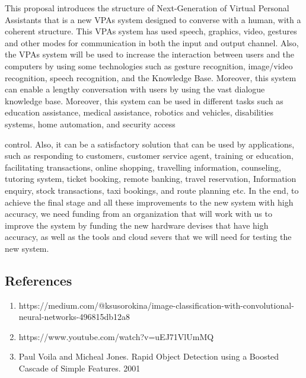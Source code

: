 \documentclass[12pt,a4paper]{article}
\begin{document}
This proposal introduces the structure of Next-Generation
of Virtual Personal Assistants that is a new VPAs system
designed to converse with a human, with a coherent structure.
This VPAs system has used speech, graphics, video, gestures
and other modes for communication in both the input and
output channel. Also, the VPAs system will be used to increase
the interaction between users and the computers by using some
technologies such as gesture recognition, image/video
recognition, speech recognition, and the Knowledge Base.
Moreover, this system can enable a lengthy conversation with
users by using the vast dialogue knowledge base. Moreover,
this system can be used in different tasks such as education
assistance, medical assistance, robotics and vehicles,
disabilities systems, home automation, and security access
\par
control. Also, it can be a satisfactory solution that can be used
by applications, such as responding to customers, customer
service agent, training or education, facilitating transactions,
online shopping, travelling information, counseling, tutoring
system, ticket booking, remote banking, travel reservation,
Information enquiry, stock transactions, taxi bookings, and
route planning etc. In the end, to achieve the final stage and all
these improvements to the new system with high accuracy, we
need funding from an organization that will work with us to
improve the system by funding the new hardware devises that
have high accuracy, as well as the tools and cloud severs that
we will need for testing the new system.

\newpage 
\begin{center}
\section{References}
\end{center}

\begin{enumerate}
\item https://medium.com/@ksusorokina/image-classification-with-convolutional-neural-networks-496815db12a8
\item https://www.youtube.com/watch?v=uEJ71VlUmMQ
\item Paul Voila and Micheal Jones. Rapid Object Detection using a Boosted Cascade of Simple Features. 2001

\end{enumerate}
\end{document}
